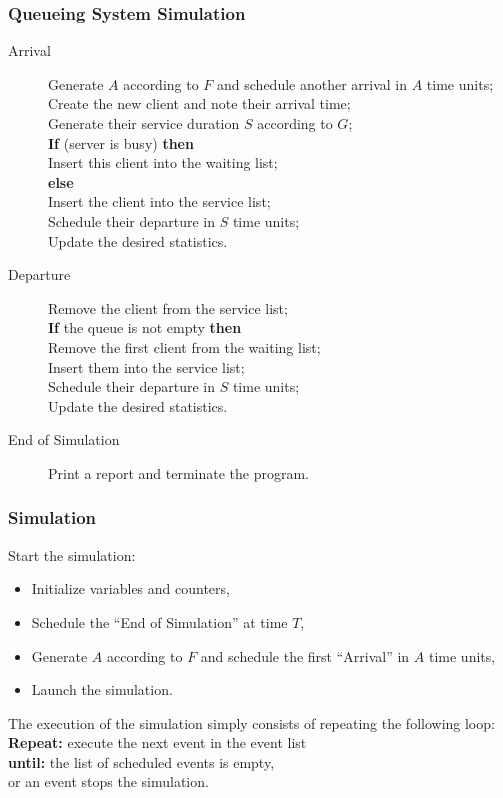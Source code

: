 \documentclass[t,usepdftitle=false]{beamer}
\begin{document}
\begin{frame}
	\frametitle{Queueing System Simulation}
	
	\begin{small}
		\begin{description}
			\item[Arrival]
			Generate $A$ according to $F$ and schedule another arrival 
			in $A$ time units;\\
			Create the new client and note their arrival time;\\
			Generate their service duration $S$ according to $G$;\\
			{\bf If} (server is busy) {\bf then}\\
			\quad Insert this client into the waiting list;\\
			{\bf else}\\
			\quad Insert the client into the service list;\\
			\quad Schedule their departure in $S$ time units; \\
			Update the desired statistics.
			\item[Departure]
			Remove the client from the service list;\\
			{\bf If} the queue is not empty {\bf then}\\
			\quad Remove the first client from the waiting list;\\
			\quad Insert them into the service list;\\
			\quad Schedule their departure in 
			$S$ time units;\\
			Update the desired statistics.
			\item[End of Simulation]
			Print a report and terminate the program.
		\end{description}
	\end{small}
\end{frame}

\begin{frame}
	\frametitle{Simulation}
	
	Start the simulation:
	\begin{itemize}
		\item Initialize variables and counters,
		\item Schedule the ``End of Simulation'' at time $T$,
		\item Generate $A$ according to $F$ and schedule the first ``Arrival'' in $A$ time units,
		\item Launch the simulation.
	\end{itemize}
	
	\mbox{}
	
	The execution of the simulation simply consists of repeating the following loop:\\
	{\bf Repeat:} execute the next event
	in the event list\\
	{\bf until:} the list of scheduled events is empty,\\
	\quad    or an event stops the simulation.
	
\end{frame}
\end{document}
